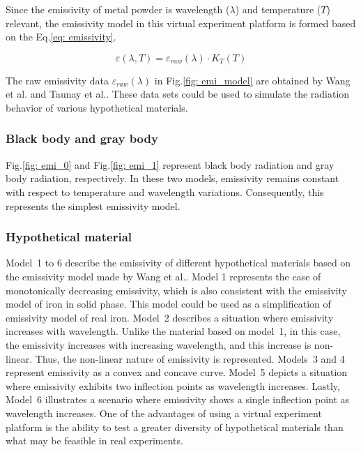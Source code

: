 Since the emissivity of metal powder is wavelength ($\lambda$) and temperature 
($T$) relevant, the emissivity model in this virtual experiment platform is 
formed based on the Eq.\ref{eq: emissivity}. 


\begin{equation}
  \label{eq: emissivity}
  \varepsilon(\lambda, T) = \varepsilon _{raw}(\lambda) \cdot K_T(T)
\end{equation}


The raw emissivity data $\varepsilon_{raw}(\lambda)$ in Fig.\ref{fig: emi_model}
are obtained by Wang et al.\cite{Wang.2021b} and Taunay et 
al.\cite{Taunay.2020b}. These data sets could be used to simulate the 
radiation behavior of various hypothetical materials.


\subsubsection{Black body and gray body}
Fig.\ref{fig: emi_0} and Fig.\ref{fig: emi_1} represent black body 
radiation and gray body radiation, respectively. In these two models, 
emissivity remains constant with respect to temperature and 
wavelength variations. Consequently, this represents the simplest 
emissivity model.

\subsubsection{Hypothetical material}
\mbox{Model 1} to 6 describe the emissivity of different hypothetical 
materials based on the emissivity model made by Wang et al.\cite{Wang.2021b}.
Model 1 represents the case of monotonically decreasing 
emissivity, which is also consistent with the emissivity model of 
iron in solid phase. This model could be used as a simplification of emissivity model of real iron.
\mbox{Model 2} describes a situation where emissivity increases with 
wavelength. Unlike the material based on \mbox{model 1}, in this case, the emissivity 
increases with increasing wavelength, and this increase is non-linear. Thus, the 
non-linear nature of emissivity is represented.
\mbox{Models 3} and 4 represent emissivity as a convex and 
concave curve. \mbox{Model 5} depicts a situation where emissivity exhibits 
two inflection points as wavelength increases. Lastly, \mbox{Model 6} 
illustrates a scenario where emissivity shows a single inflection 
point as wavelength increases. One of the advantages of using a 
virtual experiment platform is the ability to test a greater 
diversity of hypothetical materials than what may be feasible in real 
experiments.


